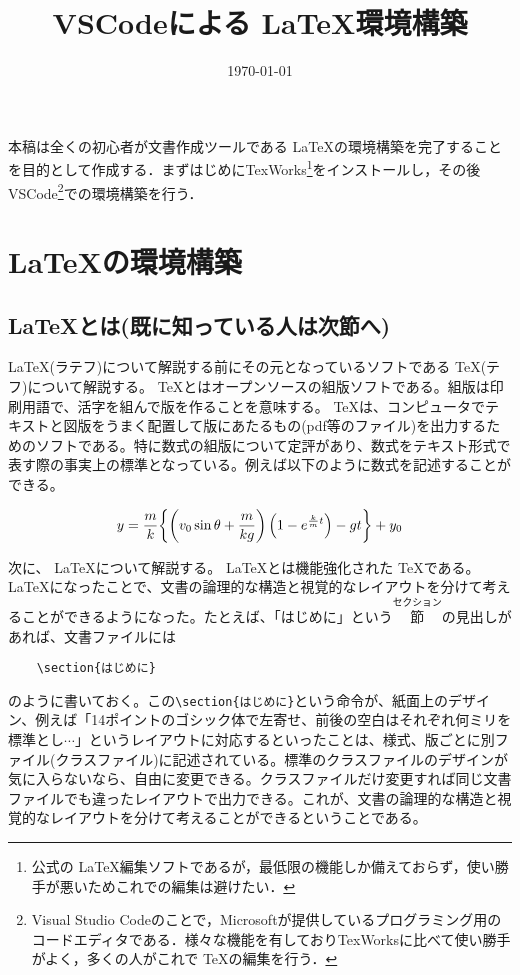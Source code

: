 \documentclass[]{ltjsarticle}
\begin{document}
  \title{VSCodeによる \LaTeX 環境構築}
  \author{}
  \date{\today}
  \maketitle

  本稿は全くの初心者が文書作成ツールである \LaTeX の環境構築を完了することを目的として作成する．まずはじめにTexWorks\footnote{公式の \LaTeX 編集ソフトであるが，最低限の機能しか備えておらず，使い勝手が悪いためこれでの編集は避けたい．}をインストールし，その後VSCode\footnote{Visual Studio Codeのことで，Microsoftが提供しているプログラミング用のコードエディタである．様々な機能を有しておりTexWorksに比べて使い勝手がよく，多くの人がこれで \TeX の編集を行う．}での環境構築を行う．
  
  \section{ \LaTeX の環境構築}
  
  \subsection{ \LaTeX とは(既に知っている人は次節へ)}
  
  \LaTeX (ラテフ)について解説する前にその元となっているソフトである \TeX (テフ)について解説する。 \TeX とはオープンソースの組版ソフトである。組版は印刷用語で、活字を組んで版を作ることを意味する。 \TeX は、コンピュータでテキストと図版をうまく配置して版にあたるもの(pdf等のファイル)を出力するためのソフトである。特に数式の組版について定評があり、数式をテキスト形式で表す際の事実上の標準となっている。例えば以下のように数式を記述することができる。

  \[y= \frac{m}{k} \qty{\left(v_0 \sin\theta + \frac{m}{kg} \right) \qty( 1 - e^{\frac{k}{m} t} ) - gt } + y_0\]

  次に、 \LaTeX について解説する。 \LaTeX とは機能強化された \TeX である。 \LaTeX になったことで、文書の論理的な構造と視覚的なレイアウトを分けて考えることができるようになった。たとえば、「はじめに」という$\overset{セクション}{節}$の見出しがあれば、文書ファイルには
  \begin{verbatim}
    \section{はじめに}
  \end{verbatim}
  のように書いておく。この\verb|\section{はじめに}|という命令が、紙面上のデザイン、例えば「14ポイントのゴシック体で左寄せ、前後の空白はそれぞれ何ミリを標準とし$\cdots$」というレイアウトに対応するといったことは、様式、版ごとに別ファイル(クラスファイル)に記述されている。標準のクラスファイルのデザインが気に入らないなら、自由に変更できる。クラスファイルだけ変更すれば同じ文書ファイルでも違ったレイアウトで出力できる。これが、文書の論理的な構造と視覚的なレイアウトを分けて考えることができるということである。
\end{document}

